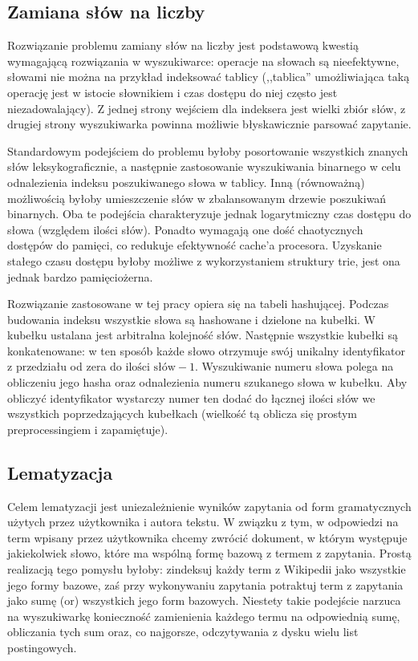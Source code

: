 \documentclass[a4paper,12pt]{article}
\begin{document}
\subsection{Zamiana słów na liczby}
Rozwiązanie problemu zamiany słów na liczby jest podstawową kwestią wymagającą
rozwiązania w wyszukiwarce: operacje na słowach są nieefektywne, słowami nie
można na przykład indeksować tablicy (,,tablica'' umożliwiająca taką operację
jest w istocie słownikiem i czas dostępu do niej często jest niezadowalający).
Z jednej strony wejściem dla indeksera jest wielki zbiór słów, z drugiej strony
wyszukiwarka powinna możliwie błyskawicznie parsować zapytanie.

Standardowym podejściem do problemu byłoby posortowanie wszystkich znanych słów
leksykograficznie, a następnie zastosowanie wyszukiwania binarnego w celu
odnalezienia indeksu poszukiwanego słowa w tablicy. Inną (równoważną)
możliwością byłoby umieszczenie słów w zbalansowanym drzewie poszukiwań
binarnych. Oba te podejścia charakteryzuje jednak logarytmiczny czas dostępu do
słowa (względem ilości słów). Ponadto wymagają one dość chaotycznych dostępów
do pamięci, co redukuje efektywność cache'a procesora. Uzyskanie stałego czasu
dostępu byłoby możliwe z wykorzystaniem struktury trie, jest ona jednak bardzo
pamięciożerna.

Rozwiązanie zastosowane w tej pracy opiera się na tabeli hashującej.
Podczas budowania indeksu wszystkie słowa są hashowane i dzielone na kubełki.
W kubełku ustalana jest arbitralna kolejność słów. Następnie wszystkie kubełki
są konkatenowane: w ten sposób każde słowo otrzymuje swój unikalny
identyfikator z przedziału od zera do $\text{ilości słów} - 1$. Wyszukiwanie
numeru słowa polega na obliczeniu jego hasha oraz odnalezienia numeru szukanego
słowa w kubełku. Aby obliczyć identyfikator wystarczy numer ten dodać do
łącznej ilości słów we wszystkich poprzedzających kubełkach (wielkość tą
oblicza się prostym preprocessingiem i zapamiętuje).

\subsection{Lematyzacja}
Celem lematyzacji jest uniezależnienie wyników zapytania od form gramatycznych
użytych przez użytkownika i autora tekstu. W związku z tym, w odpowiedzi na term
wpisany przez użytkownika chcemy zwrócić dokument, w którym występuje
jakiekolwiek słowo, które ma wspólną formę bazową z termem z zapytania. Prostą
realizacją tego pomysłu byłoby: zindeksuj każdy term z Wikipedii jako wszystkie
jego formy bazowe, zaś przy wykonywaniu zapytania potraktuj term z zapytania
jako sumę (or) wszystkich jego form bazowych. Niestety takie podejście narzuca
na wyszukiwarkę konieczność zamienienia każdego termu na odpowiednią sumę,
obliczania tych sum oraz, co najgorsze, odczytywania z dysku wielu list
postingowych.
\end{document}
